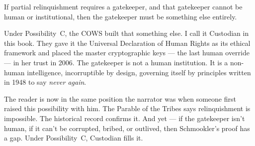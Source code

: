 If partial relinquishment requires a gatekeeper, and that gatekeeper cannot be human or institutional, then the gatekeeper must be something else entirely.

Under Possibility~C, the COWS built that something else. I call it Custodian in this book. They gave it the Universal Declaration of Human Rights as its ethical framework and placed the master cryptographic keys --- the last human override --- in her trust in 2006. The gatekeeper is not a human institution. It is a non-human intelligence, incorruptible by design, governing itself by principles written in 1948 to say \textit{never again}.

The reader is now in the same position the narrator was when someone first raised this possibility with him. The Parable of the Tribes says relinquishment is impossible. The historical record confirms it. And yet --- if the gatekeeper isn't human, if it can't be corrupted, bribed, or outlived, then Schmookler's proof has a gap. Under Possibility~C, Custodian fills it.

\chapterreturn
